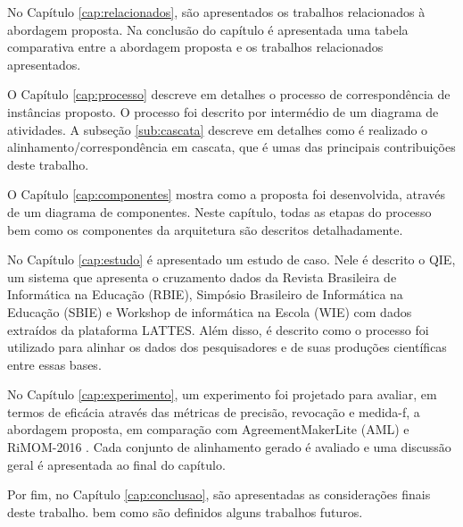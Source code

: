 No Capítulo \ref{cap:relacionados}, são apresentados os trabalhos relacionados à abordagem proposta. Na conclusão do capítulo é apresentada uma tabela comparativa entre a abordagem proposta e os trabalhos relacionados apresentados.

O Capítulo \ref{cap:processo} descreve em detalhes o processo de correspondência de instâncias proposto. O processo foi descrito por intermédio de um diagrama de atividades. A subseção \ref{sub:cascata} descreve em detalhes como é realizado o alinhamento/correspondência em cascata, que é umas das principais contribuições deste trabalho.

O Capítulo \ref{cap:componentes} mostra como a proposta foi desenvolvida, através de um diagrama de componentes. Neste capítulo, todas as etapas do processo bem como os componentes da arquitetura são descritos detalhadamente.

No Capítulo \ref{cap:estudo} é apresentado um estudo de caso. Nele é descrito o QIE, um sistema que apresenta o cruzamento dados da Revista Brasileira de Informática na Educação (RBIE), Simpósio Brasileiro de Informática na Educação (SBIE) e Workshop de informática na Escola (WIE) com dados extraídos da plataforma LATTES. Além disso, é descrito como o processo foi utilizado para alinhar os dados dos pesquisadores e de suas produções científicas entre essas bases.

No Capítulo \ref{cap:experimento}, um experimento foi projetado para avaliar, em termos de eficácia através das métricas de precisão, revocação e medida-f, a abordagem proposta, em comparação com AgreementMakerLite (AML) \cite{fariaoaei} e RiMOM-2016 \cite{zhang2016rimom}. Cada conjunto de alinhamento gerado é avaliado e uma discussão geral é apresentada ao final do capítulo.

Por fim, no Capítulo \ref{cap:conclusao}, são apresentadas as considerações finais deste trabalho. bem como são definidos alguns trabalhos futuros.
